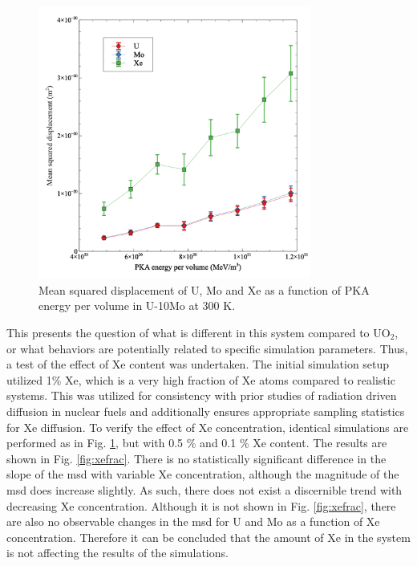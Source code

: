\documentclass[review]{elsarticle}
\begin{document}
\begin{figure}[h]
 \centering
 \includegraphics[width=0.8\textwidth]{3_epsB.png} 
 \caption{Mean squared displacement of U, Mo and Xe as a function of PKA energy per volume in U-10Mo at 300 K.}
 \label{fig:epsB_temp}
\end{figure}

This presents the question of what is different in this system compared to UO$_2$, or what behaviors are potentially related to specific simulation parameters. Thus, a test of the effect of Xe content was undertaken. The initial simulation setup utilized 1\% Xe, which is a very high fraction of Xe atoms compared to realistic systems. This was utilized for consistency with prior studies of radiation driven diffusion in nuclear fuels and additionally ensures appropriate sampling statistics for Xe diffusion. To verify the effect of Xe concentration, identical simulations are performed as in Fig. \ref{fig:epsB_temp}, but with 0.5 \% and 0.1 \% Xe content. The results are shown in Fig. \ref{fig:xefrac}. There is no statistically significant difference in the slope of the msd with variable Xe concentration, although the magnitude of the msd does increase slightly. As such, there does not exist a discernible trend with decreasing Xe concentration. Although it is not shown in Fig. \ref{fig:xefrac}, there are also no observable changes in the msd for U and Mo as a function of Xe concentration. Therefore it can be concluded that the amount of Xe in the system is not affecting the results of the simulations.
\end{document}
